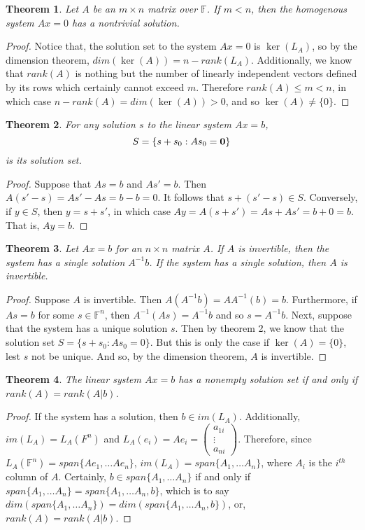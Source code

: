 \documentclass{amsbook}
\newtheorem{thm}{Theorem}
\begin{document}
\begin{thm}
Let $A$ be an $m \times n$ matrix over $\mathbb{F}$. If $m<n$, then the homogenous system $Ax=0$ has a nontrivial solution.
\end{thm}
\begin{proof}
  Notice that, the solution set to the system $Ax=0$ is $\ker(L_{A})$, so by the dimension theorem, $dim(\ker(A))=n-rank(L_{A})$. Additionally,
  we know that $rank(A)$ is nothing but the number of linearly independent vectors defined by its rows which certainly cannot exceed $m$. Therefore
  $rank(A) \leq m < n$, in which case $n-rank(A)=dim(\ker(A))>0$, and so $\ker(A)\neq \{0 \}$.
\end{proof}
\begin{thm}
For any solution $s$ to the linear system $Ax=b$, $$S=\{s+s_{0}:As_{0}=\bold{0} \}$$ is its solution set.
\end{thm}
\begin{proof}
Suppose that $As=b$ and $As'=b$. Then $A(s'-s)=As'-As=b-b=0$. It follows that $s+(s'-s) \in S$. Conversely, if $y \in S$, then $y=s+s'$, in which case $Ay=A(s+s')=As+As'=b+0=b$. That is, $Ay=b$.
\end{proof}
\begin{thm}
  Let $Ax=b$ for an $n \times n$ matrix $A$. If $A$ is invertible, then the system has a single solution $A^{-1}b$. If the system has a single solution, then $A$ is invertible.
\end{thm}
\begin{proof}
  Suppose $A$ is invertible. Then $A(A^{-1}b)=AA^{-1}(b)=b$. Furthermore, if $As=b$ for some $s \in \mathbb{F}^{n}$, then $A^{-1}(As)=A^{-1}b$ and so $s=A^{-1}b$.
  Next, suppose that the system has a unique solution $s$. Then by theorem 2, we know that the solution set $S=\{s+s_{0}: As_{0}=0 \}$. But this
  is only the case if $\ker(A)=\{0\}$, lest $s$ not be unique. And so, by the dimension theorem, $A$ is invertible.
\end{proof}
\begin{thm}
The linear system $Ax=b$ has a nonempty solution set if and only if $rank(A)=rank(A|b)$.
\end{thm}
\begin{proof}
  If the system has a solution, then $b \in im(L_{A})$. Additionally, $im(L_{A})=L_{A}(F^{n})$ and $L_{A}(e_{i})=Ae_{i}=
  \begin{pmatrix} a_{1i} \\ \vdots \\ a_{ni}   \end{pmatrix}$. Therefore, since $L_{A}(\mathbb{F}^{n})=span\{Ae_{1}, \dots Ae_{n}\}$,
  $im(L_{A})=span\{A_{1}, \dots A_{n}\}$, where $A_{i}$ is the $i^{th}$ column of $A$.
  Certainly, $b \in span\{A_{1}, \dots A_{n}\}$ if and only if $span\{A_{1}, \dots A_{n}\}=span\{A_{1}, \dots A_{n}, b\}$, which is to say
  $dim(span\{A_{1}, \dots A_{n}\})=dim(span\{A_{1}, \dots A_{n}, b\})$, or, $rank(A)=rank(A|b)$.
\end{proof}
\end{document}
